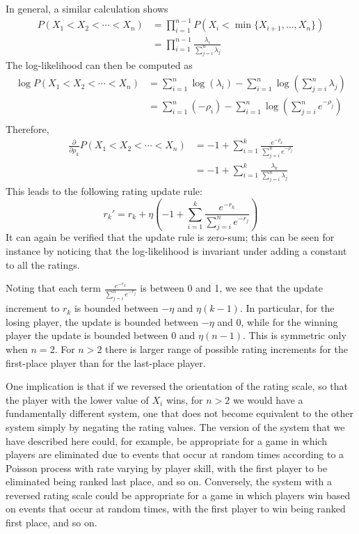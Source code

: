 \documentclass{article}
\begin{document}
	In general, a similar calculation shows
	\begin{align*}
		P(X_1 < X_2 < \cdots < X_n) &= \prod_{i=1}^{n-1} P(X_i < \min\{X_{i+1}, \dots, X_n\})\\
		&= \prod_{i=1}^{n-1} \frac{\lambda_i}{\sum_{j=i}^n \lambda_j}
	\end{align*}
	The log-likelihood can then be computed as
	\begin{align*}
		\log P(X_1 < X_2 < \cdots < X_n) &= \sum_{i=1}^n \log(\lambda_i) - \sum_{i=1}^n \log\left(\sum_{j=i}^n \lambda_j\right) \\
		&= \sum_{i=1}^n (-\rho_i) - \sum_{i=1}^n \log\left(\sum_{j=i}^n e^{-\rho_j}\right) \\
	\end{align*}
	Therefore,
	\begin{align*}
		\frac{\partial}{\partial \rho_k} P(X_1 < X_2 < \cdots < X_n) &= -1 + \sum_{i=1}^k \frac{e^{-\rho_k}}{\sum_{j=i}^n e^{-\rho_j}} \\
		&= -1 + \sum_{i=1}^k \frac{\lambda_k}{\sum_{j=i}^n \lambda_j}
	\end{align*}
	This leads to the following rating update rule:
	$$r_k' = r_k + \eta\left(-1 + \sum_{i=1}^k \frac{e^{-r_k}}{\sum_{j=i}^n e^{-r_j}}\right)$$
	It can again be verified that the update rule is zero-sum; this can be seen for instance by noticing that the log-likelihood is invariant under
	adding a constant to all the ratings. 
	
	Noting that each term $\frac{e^{-r_k}}{\sum_{j=i}^n e^{-r_j}}$ is between 0 and 1, we see that the update
	increment to $r_k$ is bounded between $-\eta$ and $\eta(k - 1)$. In particular, for the losing player, the update is bounded between $-\eta$ and 0, while for the winning player the update is bounded between 0 and $\eta(n - 1)$. This is symmetric only when $n=2$. For $n>2$ there is larger range of
	possible rating increments for the first-place player than for the last-place player.
	
	One implication is that if we reversed the orientation of the rating scale, so that the player with the lower value of $X_i$ wins, for $n>2$ we would have
	a fundamentally different system, one that does not become equivalent to the other system simply by negating the rating values.
	The version of the system that we have described here could, for example, be appropriate for a game in which players are eliminated due to events that
	occur at random times according to a Poisson process with rate varying by player skill, with the first player to be eliminated being ranked last place, and so on. Conversely, the system with a reversed rating scale could be appropriate for a game in which players win based on events that occur at random times, with the
	first player to win being ranked first place, and so on.
	
\end{document}
